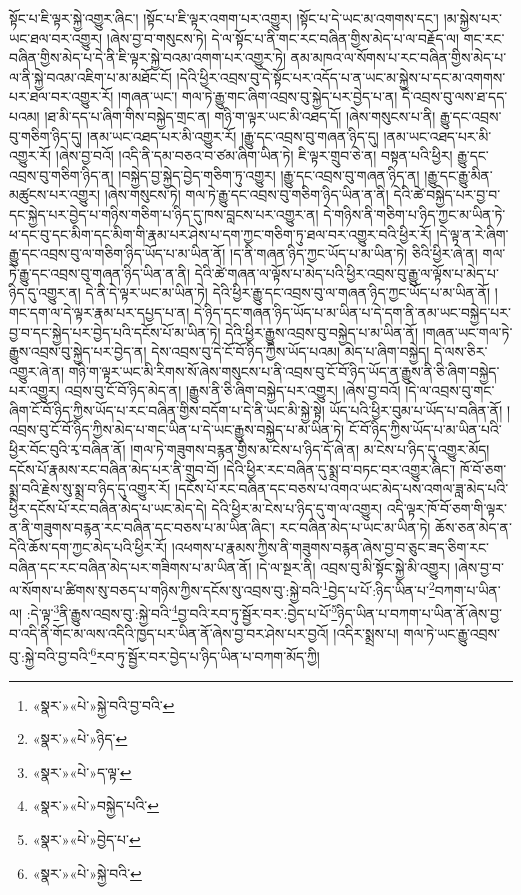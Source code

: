 སྟོང་པ་ཇི་ལྟར་སྐྱེ་འགྱུར་ཞིང་། །སྟོང་པ་ཇི་ལྟར་འགག་པར་འགྱུར། །སྟོང་པ་དེ་ཡང་མ་འགགས་དང་། །མ་སྐྱེས་པར་ཡང་ཐལ་བར་འགྱུར། །ཞེས་བྱ་བ་གསུངས་ཏེ། དེ་ལ་སྟོང་པ་ནི་གང་རང་བཞིན་གྱིས་མེད་པ་ལ་བརྗོད་ལ། གང་རང་བཞིན་གྱིས་མེད་པ་དེ་ནི་ཇི་ལྟར་སྐྱེ་བའམ་འགག་པར་འགྱུར་ཏེ། ནམ་མཁའ་ལ་སོགས་པ་རང་བཞིན་གྱིས་མེད་པ་ལ་ནི་སྐྱེ་བའམ་འཇིག་པ་མ་མཐོང་ངོ། །དེའི་ཕྱིར་འབྲས་བུ་དེ་སྟོང་པར་འདོད་པ་ན་ཡང་མ་སྐྱེས་པ་དང་མ་འགགས་པར་ཐལ་བར་འགྱུར་རོ། །གཞན་ཡང་། གལ་ཏེ་རྒྱུ་གང་ཞིག་འབྲས་བུ་སྐྱེད་པར་བྱེད་པ་ན། དེ་འབྲས་བུ་ལས་ཐ་དད་པའམ། །ཐ་མི་དད་པ་ཞིག་གིས་བསྐྱེད་གྲང་ན། གཉི་ག་ལྟར་ཡང་མི་འཐད་དོ། །ཞེས་གསུངས་པ་ནི། རྒྱུ་དང་འབྲས་བུ་གཅིག་ཉིད་དུ། །ནམ་ཡང་འཐད་པར་མི་འགྱུར་རོ། །རྒྱུ་དང་འབྲས་བུ་གཞན་ཉིད་དུ། །ནམ་ཡང་འཐད་པར་མི་འགྱུར་རོ། །ཞེས་བྱ་བའོ། །འདི་ནི་དམ་བཅའ་བ་ཙམ་ཞིག་ཡིན་ཏེ། ཇི་ལྟར་གྲུབ་ཅེ་ན། བསྟན་པའི་ཕྱིར། རྒྱུ་དང་འབྲས་བུ་གཅིག་ཉིད་ན། །བསྐྱེད་བྱ་སྐྱེད་བྱེད་གཅིག་ཏུ་འགྱུར། །རྒྱུ་དང་འབྲས་བུ་གཞན་ཉིད་ན། །རྒྱུ་དང་རྒྱུ་མིན་མཚུངས་པར་འགྱུར། །ཞེས་གསུངས་ཏེ། གལ་ཏེ་རྒྱུ་དང་འབྲས་བུ་གཅིག་ཉིད་ཡིན་ན་ནི། དེའི་ཚེ་བསྐྱེད་པར་བྱ་བ་དང་སྐྱེད་པར་བྱེད་པ་གཉིས་གཅིག་པ་ཉིད་དུ་ཁས་བླངས་པར་འགྱུར་ན། དེ་གཉིས་ནི་གཅིག་པ་ཉིད་ཀྱང་མ་ཡིན་ཏེ་ཕ་དང་བུ་དང་མིག་དང་མིག་གི་རྣམ་པར་ཤེས་པ་དག་ཀྱང་གཅིག་ཏུ་ཐལ་བར་འགྱུར་བའི་ཕྱིར་རོ། །དེ་ལྟ་ན་རེ་ཞིག་རྒྱུ་དང་འབྲས་བུ་ལ་གཅིག་ཉིད་ཡོད་པ་མ་ཡིན་ནོ། །ད་ནི་གཞན་ཉིད་ཀྱང་ཡོད་པ་མ་ཡིན་ཏེ། ཅིའི་ཕྱིར་ཞེ་ན། གལ་ཏེ་རྒྱུ་དང་འབྲས་བུ་གཞན་ཉིད་ཡིན་ན་ནི། དེའི་ཚེ་གཞན་ལ་ལྟོས་པ་མེད་པའི་ཕྱིར་འབྲས་བུ་རྒྱུ་ལ་ལྟོས་པ་མེད་པ་ཉིད་དུ་འགྱུར་ན། དེ་ནི་དེ་ལྟར་ཡང་མ་ཡིན་ཏེ། དེའི་ཕྱིར་རྒྱུ་དང་འབྲས་བུ་ལ་གཞན་ཉིད་ཀྱང་ཡོད་པ་མ་ཡིན་ནོ། །གང་དག་ལ་དེ་ལྟར་རྣམ་པར་དཔྱད་པ་ན། དེ་ཉིད་དང་གཞན་ཉིད་ཡོད་པ་མ་ཡིན་པ་དེ་དག་ནི་ནམ་ཡང་བསྐྱེད་པར་བྱ་བ་དང་སྐྱེད་པར་བྱེད་པའི་དངོས་པོ་མ་ཡིན་ཏེ། དེའི་ཕྱིར་རྒྱུས་འབྲས་བུ་བསྐྱེད་པ་མ་ཡིན་ནོ། །གཞན་ཡང་གལ་ཏེ་རྒྱུས་འབྲས་བུ་སྐྱེད་པར་བྱེད་ན། དེས་འབྲས་བུ་དེ་ངོ་བོ་ཉིད་ཀྱིས་ཡོད་པའམ། མེད་པ་ཞིག་བསྐྱེད། དེ་ལས་ཅིར་འགྱུར་ཞེ་ན། གཉི་ག་ལྟར་ཡང་མི་རིགས་སོ་ཞེས་གསུངས་པ་ནི་འབྲས་བུ་ངོ་བོ་ཉིད་ཡོད་ན་རྒྱུས་ནི་ཅི་ཞིག་བསྐྱེད་པར་འགྱུར། འབྲས་བུ་ངོ་བོ་ཉིད་མེད་ན། །རྒྱུས་ནི་ཅི་ཞིག་བསྐྱེད་པར་འགྱུར། །ཞེས་བྱ་བའོ། །དེ་ལ་འབྲས་བུ་གང་ཞིག་ངོ་བོ་ཉིད་ཀྱིས་ཡོད་པ་རང་བཞིན་གྱིས་བདོག་པ་དེ་ནི་ཡང་མི་སྐྱེ་སྟེ། ཡོད་པའི་ཕྱིར་བུམ་པ་ཡོད་པ་བཞིན་ནོ། །འབྲས་བུ་ངོ་བོ་ཉིད་ཀྱིས་མེད་པ་གང་ཡིན་པ་དེ་ཡང་རྒྱུས་བསྐྱེད་པ་མ་ཡིན་ཏེ། ངོ་བོ་ཉིད་ཀྱིས་ཡོད་པ་མ་ཡིན་པའི་ཕྱིར་བོང་བུའི་རྭ་བཞིན་ནོ། །གལ་ཏེ་གཟུགས་བརྙན་གྱིས་མ་ངེས་པ་ཉིད་དོ་ཞེ་ན། མ་ངེས་པ་ཉིད་དུ་འགྱུར་མོད། དངོས་པོ་རྣམས་རང་བཞིན་མེད་པར་ནི་གྲུབ་བོ། །དེའི་ཕྱིར་རང་བཞིན་དུ་སྨྲ་བ་བཏང་བར་འགྱུར་ཞིང་། ཁོ་བོ་ཅག་སྨྲ་བའི་རྗེས་སུ་སྨྲ་བ་ཉིད་དུ་འགྱུར་རོ། །དངོས་པོ་རང་བཞིན་དང་བཅས་པ་འགའ་ཡང་མེད་པས་འགལ་ཟླ་མེད་པའི་ཕྱིར་དངོས་པོ་རང་བཞིན་མེད་པ་ཡང་མེད་དེ། དེའི་ཕྱིར་མ་ངེས་པ་ཉིད་དུ་ག་ལ་འགྱུར། འདི་ལྟར་ཁོ་བོ་ཅག་གི་ལྟར་ན་ནི་གཟུགས་བརྙན་རང་བཞིན་དང་བཅས་པ་མ་ཡིན་ཞིང་། རང་བཞིན་མེད་པ་ཡང་མ་ཡིན་ཏེ། ཆོས་ཅན་མེད་ན་དེའི་ཆོས་དག་ཀྱང་མེད་པའི་ཕྱིར་རོ། །འཕགས་པ་རྣམས་ཀྱིས་ནི་གཟུགས་བརྙན་ཞེས་བྱ་བ་ཅུང་ཟད་ཅིག་རང་བཞིན་དང་རང་བཞིན་མེད་པར་གཟིགས་པ་མ་ཡིན་ནོ། །དེ་ལ་སྔར་ནི། འབྲས་བུ་མི་སྟོང་སྐྱེ་མི་འགྱུར། །ཞེས་བྱ་བ་ལ་སོགས་པ་ཚིགས་སུ་བཅད་པ་གཉིས་ཀྱིས་དངོས་སུ་འབྲས་བུ་:སྐྱེ་བའི་\footnote{«སྣར་»«པེ་»སྐྱེ་བའི་བྱ་བའི་}བྱེད་པ་པོ་:ཉིད་ཡིན་པ་\footnote{«སྣར་»«པེ་»ཉིད་}བཀག་པ་ཡིན་ལ། :དེ་ལྟ་\footnote{«སྣར་»«པེ་»ད་ལྟ་}ནི་རྒྱུས་འབྲས་བུ་:སྐྱེ་བའི་\footnote{«སྣར་»«པེ་»བསྐྱེད་པའི་}བྱ་བའི་རབ་ཏུ་སྦྱོར་བར་:བྱེད་པ་པོ་\footnote{«སྣར་»«པེ་»བྱེད་པ་}ཉིད་ཡིན་པ་བཀག་པ་ཡིན་ནོ་ཞེས་བྱ་བ་འདི་ནི་གོང་མ་ལས་འདིའི་ཁྱད་པར་ཡིན་ནོ་ཞེས་བྱ་བར་ཤེས་པར་བྱའོ། །འདིར་སྨྲས་པ། གལ་ཏེ་ཡང་རྒྱུ་འབྲས་བུ་:སྐྱེ་བའི་བྱ་བའི་\footnote{«སྣར་»«པེ་»སྐྱེ་བའི་}རབ་ཏུ་སྦྱོར་བར་བྱེད་པ་ཉིད་ཡིན་པ་བཀག་མོད་ཀྱི། 